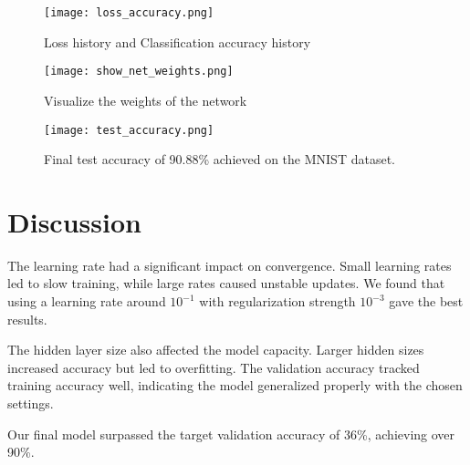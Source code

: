 \begin{figure}[h]
\centering
\texttt{[image: loss\_accuracy.png]}
\caption{Loss history and Classification accuracy history}
\end{figure}

\begin{figure}[h]
\centering
\texttt{[image: show\_net\_weights.png]}
\caption{Visualize the weights of the network}
\end{figure}

\begin{figure}[h]
\centering
\texttt{[image: test\_accuracy.png]}
\caption{Final test accuracy of 90.88\% achieved on the MNIST dataset.}
\end{figure}

\section{Discussion}
\label{sec:discussion}

The learning rate had a significant impact on convergence.
Small learning rates led to slow training, while large rates caused unstable updates.
We found that using a learning rate around $10^{-1}$ with regularization strength $10^{-3}$ gave the best results.

The hidden layer size also affected the model capacity. Larger hidden sizes increased accuracy but led to overfitting.
The validation accuracy tracked training accuracy well, indicating the model generalized properly with the chosen settings.

Our final model surpassed the target validation accuracy of 36\%, achieving over 90\%.
